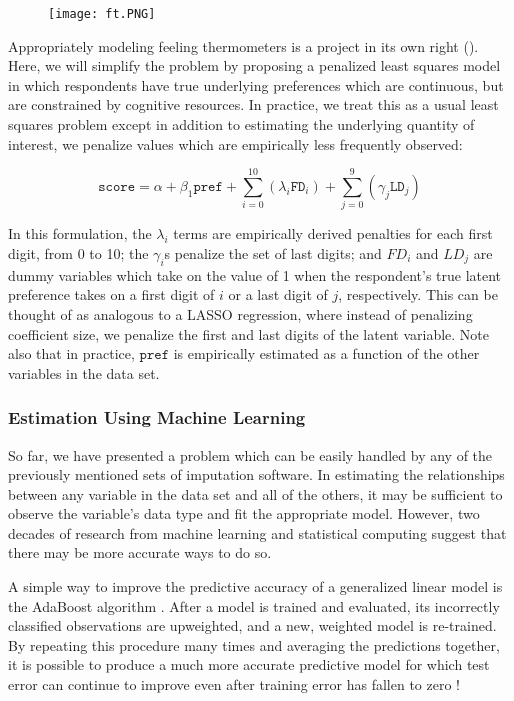 \documentclass{article}
\begin{document}
\begin{figure}[H]
\centering
\texttt{[image: ft.PNG]}
\end{figure}

Appropriately modeling feeling thermometers is a project in its own right (\citep{kaufman2015ft}). Here, we will simplify the problem by proposing a penalized least squares model in which respondents have true underlying preferences which are continuous, but are constrained by cognitive resources. In practice, we treat this as a usual least squares problem except in addition to estimating the underlying quantity of interest, we penalize values which are empirically less frequently observed:

$$\mathtt{score} = \alpha + \beta_1 \mathtt{pref} + \sum_{i=0}^{10}( \lambda_i \mathtt{FD}_i) + \sum_{j=0}^{9}(\gamma_j \mathtt{LD}_j)$$

In this formulation, the $\lambda_i$ terms are empirically derived penalties for each first digit, from 0 to 10; the $\gamma_i$s penalize the set of last digits; and $FD_i$ and $LD_j$ are dummy variables which take on the value of 1 when the respondent's true latent preference takes on a first digit of $i$ or a last digit of $j$, respectively. This can be thought of as analogous to a LASSO regression, where instead of penalizing coefficient size, we penalize the first and last digits of the latent variable. Note also that in practice, $\mathtt{pref}$ is empirically estimated as a function of the other variables in the data set.

\subsubsection{Estimation Using Machine Learning}
\label{sec:ml}

So far, we have presented a problem which can be easily handled by any of the previously mentioned sets of imputation software. In estimating the relationships between any variable in the data set and all of the others, it may be sufficient to observe the variable's data type and fit the appropriate model. However, two decades of research from machine learning and statistical computing suggest that there may be more accurate ways to do so. 

A simple way to improve the predictive accuracy of a generalized linear model is the AdaBoost algorithm \citep{freund1999short}. After a model is trained and evaluated, its incorrectly classified observations are upweighted, and a new, weighted model is re-trained. By repeating this procedure many times and averaging the predictions together, it is possible to produce a much more accurate predictive model for which test error can continue to improve even after training error has fallen to zero \citep{freund1996experiments}!
\end{document}
